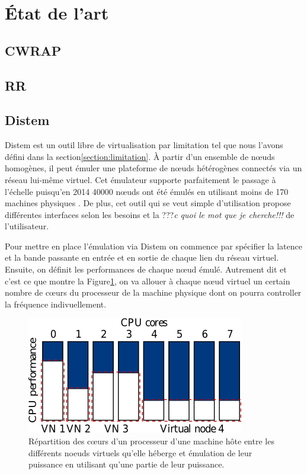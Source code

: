 \section{État de l'art}
\label{section:sota}
\subsection{CWRAP}

\subsection{RR}

\subsection{Distem}

Distem \citep{DISTEM} est un outil libre de virtualisation par limitation tel que nous l'avons défini dans la section\ref{section:limitation}. À partir d'un ensemble de n\oe uds homogènes, il peut émuler une plateforme de n\oe uds hétérogènes connectés via un réseau lui-même virtuel. Cet émulateur supporte parfaitement le passage à l'échelle puisqu'en 2014 40000 n\oe uds ont été émulés en utilisant moins de 170 machines physiques \citep{DISTEM_buchert2014emulation}. De plus, cet outil qui se veut simple d'utilisation propose différentes interfaces selon les besoins et la ???\textit{c quoi le mot que je cherche!!!} de l'utilisateur.

Pour mettre en place l'émulation via Distem on commence par spécifier la latence et la bande passante en entrée et en sortie de chaque lien du réseau virtuel. Ensuite, on définit les performances de chaque n\oe ud émulé. Autrement dit et c'est ce que montre la Figure\ref{Distem_core}, on va allouer à chaque n\oe ud virtuel un certain nombre de c\oe urs du processeur de la machine physique dont on pourra controller la fréquence indivuellement.

  \begin{figure}[H]
  \centering
  \includegraphics[scale=0.70]{Pictures/png/Distem_repartion_coeurs_v1}
  \caption{Répartition des c\oe urs d'un processeur d'une machine hôte entre les différents noeuds virtuels qu'elle héberge et émulation de leur puissance en utilisant qu'une partie de leur puissance.}
  \label{Distem_core}
  \end{figure}
  

